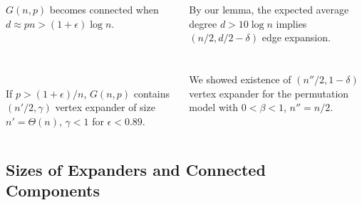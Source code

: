 \documentclass{beamer}
\newcommand{\autotitle}{\secname\ifdefempty{\subsecname}{}{~--- \subsecname}}
\begin{document}
\begin{frame}{\autotitle}
    \begin{columns}[T,onlytextwidth]
        $G(n,p)$ becomes connected when $d\approx pn>(1+\epsilon)\log n$.\\~\\~\\~\\~\\
        
        If $p>(1+\epsilon)/n$, $G(n,p)$ contains $(n'/2,\gamma)$ vertex expander
        of size $n'=\Theta(n)$, $\gamma<1$ for $\epsilon<0.89$.
        
        By our lemma, the expected average degree $d>10\log n$
        implies $(n/2,d/2-\delta)$ edge expansion.\\~\\~\\
        
        We showed existence of $(n''/2,1-\delta)$ vertex expander
        for the permutation model with $0<\beta<1$, $n''=n/2$.
    \end{columns}
\end{frame}

\subsection{Sizes of Expanders and Connected Components}
\end{document}
